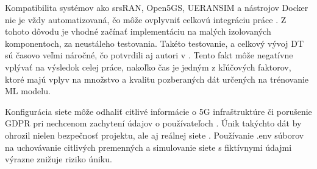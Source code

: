 {Kompatibilita systémov ako srsRAN, Open5GS, UERANSIM a nástrojov Docker nie je vždy automatizovaná, čo môže ovplyvniť celkovú integráciu práce \cite{challenges_human_factor}. Z tohoto dôvodu je vhodné začínať implementáciu na malých izolovaných komponentoch, za neustáleho testovania. Takéto testovanie, a celkový vývoj DT sú časovo veľmi náročné, čo potvrdili aj autori v \cite{USAirForce}. Tento fakt môže negatívne vplývať na výsledok celej práce, nakoľko čas je jedným z kľúčových faktorov, ktoré majú vplyv na množstvo a kvalitu pozberaných dát určených na trénovanie ML modelu.

Konfigurácia siete môže odhaliť citlivé informácie o 5G infraštruktúre či porušenie GDPR \cite{big-data-problems} pri nechcenom zachytení údajov o používateľoch \cite{challenges-technol}. Únik takýchto dát by ohrozil nielen bezpečnosť projektu, ale aj reálnej siete \cite{Dt_Iot_data_worry_about}. Používanie .env súborov na uchovávanie citlivých premenných a simulovanie siete s fiktívnymi údajmi výrazne znižuje riziko úniku.
}


